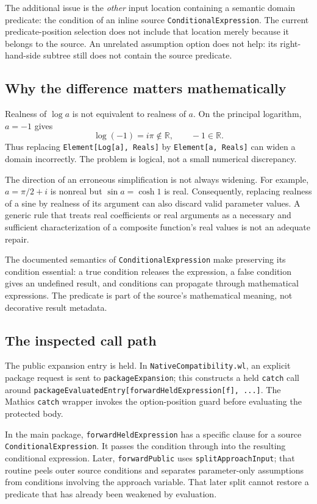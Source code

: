 \documentclass[11pt,a4paper]{article}
\newcommand{\code}[1]{\nolinkurl{#1}}
\begin{document}
The additional issue is the \emph{other} input location containing a semantic domain predicate: the condition of an inline source \code{ConditionalExpression}. The current predicate-position selection does not include that location merely because it belongs to the source. An unrelated assumption option does not help: its right-hand-side subtree still does not contain the source predicate.\cite{mathicsinput}

\subsection{Why the difference matters mathematically}
Realness of $\log a$ is not equivalent to realness of $a$. On the principal logarithm, $a=-1$ gives
\[
 \log(-1)=i\pi\notin\mathbb R,
 \qquad -1\in\mathbb R.
\]
Thus replacing \code{Element[Log[a], Reals]} by \code{Element[a, Reals]} can widen a domain incorrectly. The problem is logical, not a small numerical discrepancy.

The direction of an erroneous simplification is not always widening. For example, $a=\pi/2+i$ is nonreal but $\sin a=\cosh 1$ is real. Consequently, replacing realness of a sine by realness of its argument can also discard valid parameter values. A generic rule that treats real coefficients or real arguments as a necessary and sufficient characterization of a composite function's real values is not an adequate repair.

The documented semantics of \code{ConditionalExpression} make preserving its condition essential: a true condition releases the expression, a false condition gives an undefined result, and conditions can propagate through mathematical expressions. The predicate is part of the source's mathematical meaning, not decorative result metadata.\cite{conditional}

\subsection{The inspected call path}
The public expansion entry is held. In \code{NativeCompatibility.wl}, an explicit package request is sent to \code{packageExpansion}; this constructs a held \code{catch} call around \code{packageEvaluatedEntry[forwardHeldExpression[f], ...]}. The Mathics \code{catch} wrapper invokes the option-position guard before evaluating the protected body.\cite{nativecompat,mathicsinput}

In the main package, \code{forwardHeldExpression} has a specific clause for a source \code{ConditionalExpression}. It passes the condition through into the resulting conditional expression. Later, \code{forwardPublic} uses \code{splitApproachInput}; that routine peels outer source conditions and separates parameter-only assumptions from conditions involving the approach variable. That later split cannot restore a predicate that has already been weakened by evaluation.\cite{core,expressions}
\end{document}
